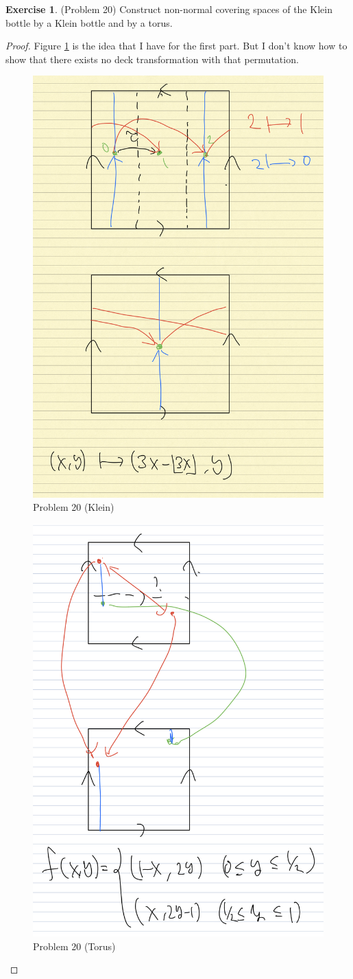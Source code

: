 \documentclass[12pt, psamsfonts]{amsart}
\theoremstyle{definition}
\newtheorem*{exer}{Exercise}
\theoremstyle{remark}
\numberwithin{equation}{section}
\begin{document}
\begin{exer}{(Problem 20)}
  Construct non-normal covering spaces of the Klein bottle by a Klein bottle and by a torus.
\end{exer}

\begin{proof}
  Figure \ref{fig:non_normal_covering_klein} is the idea that I have for the first part.
  But I don't know how to show that there exists no deck transformation with that permutation.
  \begin{figure}
    \includegraphics[width=.5\linewidth]{non_normal_covering_klein.jpeg}
    \caption{Problem 20 (Klein)}
    \label{fig:non_normal_covering_klein}
  \end{figure}

  \begin{figure}
    \includegraphics[width=.5\linewidth]{non_normal_covering_torus.jpeg}
    \caption{Problem 20 (Torus)}
    \label{fig:non_normal_covering_torus}
  \end{figure}
  
\end{proof}
\end{document}
